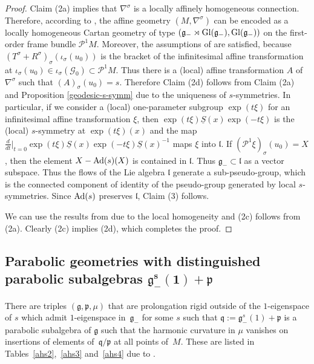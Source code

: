 \documentclass[10pt,a4paper]{amsart}
\newcommand{\si}{\sigma}
\newcommand{\un}{\underline}
\newcommand{\ba}{\mathcal{G}}
\newcommand{\fg}{\mathfrak g}
\newcommand{\fv}{\mathfrak q}
\newcommand{\fp}{\mathfrak p}
\newcommand{\fl}{\mathfrak l}
\newcommand{\Ad}{{\rm Ad}}
\numberwithin{equation}{section}
\begin{document}
\begin{proof}
Claim (2a) implies that $\nabla^\si$ is a locally af\/f\/inely homogeneous connection. Therefore, according to \cite[Section 1.5]{disertace}, the af\/f\/ine geometry $(M,\nabla^\si)$ can be encoded as a locally homogeneous Cartan geometry of type $(\fg_-\rtimes {\rm Gl}(\fg_-),{\rm Gl}(\fg_-))$ on the f\/irst-order frame bundle $\mathcal{P}^1M$. Moreover, the assumptions of \cite[Lemma~2.2]{GZ2} are satisf\/ied, because $(T^\si+R^\si)_\si(\iota_\si(u_0))$ is the bracket of the inf\/initesimal af\/f\/ine transformation at $\iota_\si(u_0)\in \iota_\si(\ba_0)\subset \mathcal{P}^1M$. Thus there is a (local) af\/f\/ine transformation $A$ of $\nabla^\si$ such that $(A)_\si(u_0)=s$. Therefore Claim (2d) follows from Claim (2a) and Proposition \ref{geodesic-s-symm} due to the uniqueness of $s$-symmetries. In particular, if we consider a (local) one-parameter subgroup $\exp(t\xi)$ for an inf\/initesimal af\/f\/ine transformation $\xi$, then $\exp(t\xi)\un S(x)\exp(-t\xi)$ is the (local) $s$-symmetry at $\exp(t\xi)(x)$ and the map $\frac{d}{dt}|_{t=0}\exp(t\xi)\un S(x)\exp(-t\xi)\un S(x)^{-1}$ maps $\xi$ into $\fl$. If $(\mathcal{P}^1\xi)_\si(u_0)=X$, then the element $X-\Ad(s)(X)$ is contained in $\fl$. Thus $\fg_-\subset \fl$ as a vector subspace. Thus the f\/lows of the Lie algebra $\fl$ generate
a sub-pseudo-group, which is the connected component of identity of the pseudo-group generated by local $s$-symmetries. Since $\Ad(s)$ preserves $\fl$, Claim (3) follows.

We can use the results from \cite[Theorem 1.3]{GZ3} due to the local homogeneity and (2c) follows from (2a). Clearly (2c) implies (2d), which completes the proof.
\end{proof}


\subsection[Parabolic geometries with distinguished parabolic subalgebras $\fg_-^s(1)+\fp$]{Parabolic geometries with distinguished parabolic subalgebras $\boldsymbol{\fg_-^s(1)+\fp}$}\label{sec5.2}

There are triples $(\fg,\fp,\mu)$ that are prolongation rigid outside of the $1$-eigenspace of $s$ which admit $1$-eigen\-space in~$\fg_-$ for some $s$ such that $\fv:=\fg_-^s(1)+\fp$ is a parabolic subalgebra of $\fg$ such that the harmonic curvature in $\mu$ vanishes on insertions of elements of~$\fv/\fp$ at all points of~$M$. These are listed in Tables~\ref{ahs2},~\ref{ahs3} and~\ref{ahs4} due to \cite[Propositions~6.2 and~A.2]{GZ3}.
\end{document}
